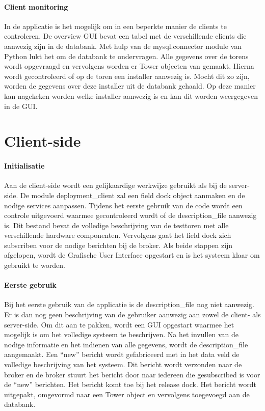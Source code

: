 \paragraph{Client monitoring}
In de applicatie is het mogelijk om in een beperkte manier de clients te controleren.
De overview GUI bevat een tabel met de verschillende clients die aanwezig zijn in de databank.
Met hulp van de mysql.connector module van Python lukt het om de databank te ondervragen.
Alle gegevens over de torens wordt opgevraagd en vervolgens worden er Tower objecten van gemaakt.
Hierna wordt gecontroleerd of op de toren een installer aanwezig is.
Mocht dit zo zijn, worden de gegevens over deze installer uit de databank gehaald.
Op deze manier kan nagekeken worden welke installer aanwezig is en kan dit worden weergegeven in de GUI.

\section{Client-side}
\paragraph{Initialisatie}
Aan de client-side wordt een gelijkaardige werkwijze gebruikt als bij de server-side.
De module deployment\_client zal een field dock object aanmaken en de nodige services aanpassen.
Tijdens het eerste gebruik van de code wordt een controle uitgevoerd waarmee gecontroleerd wordt of de description\_file aanwezig is.
Dit bestand bevat de volledige beschrijving van de testtoren met alle verschillende hardware componenten.
Vervolgens gaat het field dock zich subscriben voor de nodige berichten bij de broker.
Als beide stappen zijn afgelopen, wordt de Grafische User Interface opgestart en is het systeem klaar om gebruikt te worden.

\paragraph{Eerste gebruik}
Bij het eerste gebruik van de applicatie is de description\_file nog niet aanwezig.
Er is dan nog geen beschrijving van de gebruiker aanwezig aan zowel de client- als server-side.
Om dit aan te pakken, wordt een GUI opgestart waarmee het mogelijk is om het volledige systeem te beschrijven.
Na het invullen van de nodige informatie en het indienen van alle gegevens, wordt de description\_file aangemaakt.
Een ``new'' bericht wordt gefabriceerd met in het data veld de volledige beschrijving van het systeem.
Dit bericht wordt verzonden naar de broker en de broker stuurt het bericht door naar iedereen die gesubscribed is voor de ``new'' berichten.
Het bericht komt toe bij het release dock.
Het bericht wordt uitgepakt, omgevormd naar een Tower object en vervolgens toegevoegd aan de databank.


